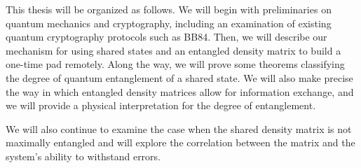 This thesis will be organized as follows.  We will begin with preliminaries on quantum mechanics and cryptography, including an examination of existing quantum cryptography protocols such as BB84. Then, we will describe our mechanism for using shared states and an entangled density matrix to build a one-time pad remotely. Along the way, we will prove some theorems classifying the degree of quantum entanglement of a shared state. We will also make precise the way in which entangled density matrices allow for information exchange, and we will provide a physical interpretation for the degree of entanglement. 

We will also continue to examine the case when the shared density matrix is not maximally entangled and will explore the correlation between the matrix and the system's ability to withstand errors. 
